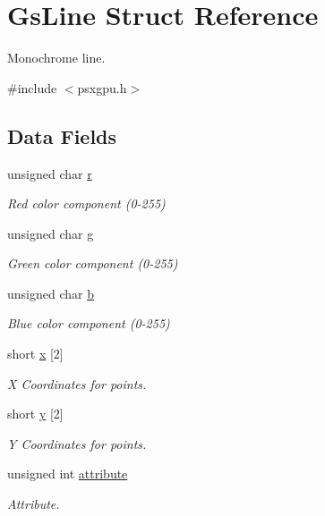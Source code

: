 \hypertarget{structGsLine}{}\section{Gs\+Line Struct Reference}
\label{structGsLine}


Monochrome line.  




{\ttfamily \#include $<$psxgpu.\+h$>$}

\subsection*{Data Fields}
\begin{DoxyCompactItemize}
\item 
unsigned char \hyperlink{structGsLine_a382e46657bca42b20566e51ce1650673}{r}
\begin{DoxyCompactList}\small\item\em Red color component (0-\/255) \end{DoxyCompactList}\item 
unsigned char \hyperlink{structGsLine_a266688a62e598c2240daf3f207a95057}{g}
\begin{DoxyCompactList}\small\item\em Green color component (0-\/255) \end{DoxyCompactList}\item 
unsigned char \hyperlink{structGsLine_a99701c888c36ce7e0f4cf9133949d305}{b}
\begin{DoxyCompactList}\small\item\em Blue color component (0-\/255) \end{DoxyCompactList}\item 
short \hyperlink{structGsLine_a9f199bc7586a8693bc1fe960aa019ba3}{x} \mbox{[}2\mbox{]}
\begin{DoxyCompactList}\small\item\em X Coordinates for points. \end{DoxyCompactList}\item 
short \hyperlink{structGsLine_ad9a2ccbd59395269d1a193f68e56d89e}{y} \mbox{[}2\mbox{]}
\begin{DoxyCompactList}\small\item\em Y Coordinates for points. \end{DoxyCompactList}\item 
unsigned int \hyperlink{structGsLine_ae6c49c59ee6587c941678ecb2a11dbe7}{attribute}
\begin{DoxyCompactList}\small\item\em Attribute. \end{DoxyCompactList}\end{DoxyCompactItemize}


